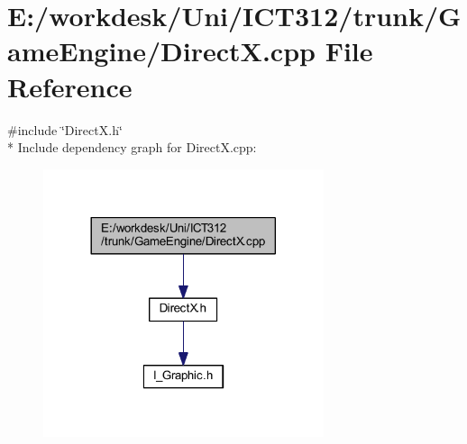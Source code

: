 \section{E\+:/workdesk/\+Uni/\+I\+C\+T312/trunk/\+Game\+Engine/\+Direct\+X.cpp File Reference}
\label{_direct_x_8cpp}
{\ttfamily \#include \char`\"{}Direct\+X.\+h\char`\"{}}\\*
Include dependency graph for Direct\+X.\+cpp\+:\nopagebreak
\begin{figure}[H]
\begin{center}
\leavevmode
\includegraphics[width=233pt]{d2/d51/_direct_x_8cpp__incl}
\end{center}
\end{figure}
